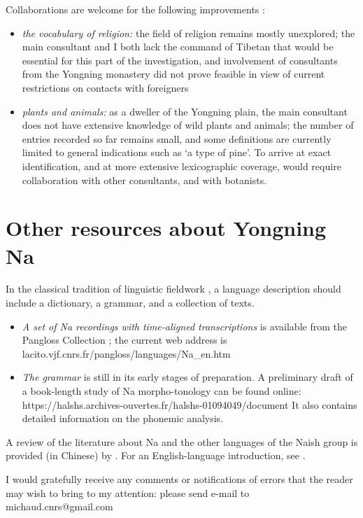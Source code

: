 \documentclass[oldfontcommands,oneside,a4paper,11pt]{article}
\begin{document}
	Collaborations are welcome for the following improvements :
	\begin{itemize}
		\item \textit{the vocabulary of religion:} the field of religion remains mostly unexplored; the main consultant and I both lack the command of Tibetan that would be essential for this part of the investigation, and involvement of consultants from the Yongning monastery did not prove feasible in view of current restrictions on contacts with foreigners
		\item \textit{plants and animals:} as a dweller of the Yongning plain, the main consultant does not have extensive knowledge of wild plants and animals; the number of entries recorded so far remains small, and some definitions are currently limited to general indications such as ‘a type of pine'. To arrive at exact identification, and at more extensive lexicographic coverage, would require collaboration with other consultants, and with botanists.
	\end{itemize}
	
	\section{Other resources about Yongning Na} \label{sec:resources}
	
	In the classical tradition of linguistic fieldwork \citep{Dixon2007}, a language description should include a dictionary, a grammar, and a collection of texts. 
	
	\begin{itemize}
		\item \textit{A set of Na recordings with time-aligned transcriptions} is available from the Pangloss Collection \citep{Michailovsky2014}; the current web address is lacito.vjf.cnrs.fr/pangloss/languages/Na\_en.htm 
		\item \textit{The grammar} is still in its early stages of preparation. A preliminary draft of a book-length study of Na morpho-tonology can be found online: https://halshs.archives-ouvertes.fr/halshs-01094049/document It also contains detailed information on the phonemic analysis.
	\end{itemize}
	
	A review of the literature about Na and the other languages of the Naish  group is provided (in Chinese) by \citet{Li2015}. For an English-language introduction, see \citet{Michaud2015b}.
	
	I would gratefully receive any comments or notifications of errors that the reader may wish to bring to my attention: please send e-mail to michaud.cnrs@gmail.com 
	
\end{document}

